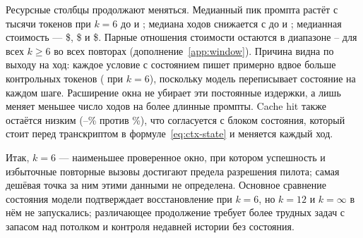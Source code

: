Ресурсные столбцы продолжают меняться. Медианный пик промпта растёт с
\WindowSixPeakMedian{} тысячи токенов при $k=6$ до
\WindowTwelvePeakMedian{} и \WindowInfinitePeakMedian{}; медиана ходов
снижается с \WindowSixCallsMedian{} до \WindowTwelveCallsMedian{}
и \WindowInfiniteCallsMedian{}; медианная стоимость ---
\$\WindowSixCostMedian{}, \$\WindowTwelveCostMedian{}
и \$\WindowInfiniteCostMedian{}. Парные отношения стоимости остаются
в диапазоне \WindowInfiniteCostRatioMin--\WindowTwelveCostRatioMax{}
для всех $k\geq6$ во всех повторах (дополнение~\ref{app:window}).
Причина видна по выходу на ход: каждое условие с состоянием пишет примерно
вдвое больше контрольных \WindowControlOutputPerTurn{} токенов
(\WindowSixOutputPerTurn{} при $k=6$), поскольку модель переписывает
состояние на каждом шаге. Расширение окна не убирает эти постоянные
издержки, а лишь меняет меньшее число ходов на более длинные промпты.
Cache hit также остаётся низким
(\WindowSixCacheHit--\WindowInfiniteCacheHit\% против
\WindowControlCacheHit\%), что согласуется с блоком состояния, который
стоит перед транскриптом в формуле~\eqref{eq:ctx-state} и меняется
каждый ход.

Итак, $k=6$ --- наименьшее проверенное окно, при котором успешность
и избыточные повторные вызовы достигают предела разрешения пилота;
самая дешёвая точка за ним этими данными не определена. Основное сравнение
состояния модели подтверждает восстановление при $k=6$, но $k=12$ и $k=\infty$
в нём не запускались; различающее продолжение требует более трудных задач
с запасом над потолком и контроля недавней истории без состояния.
